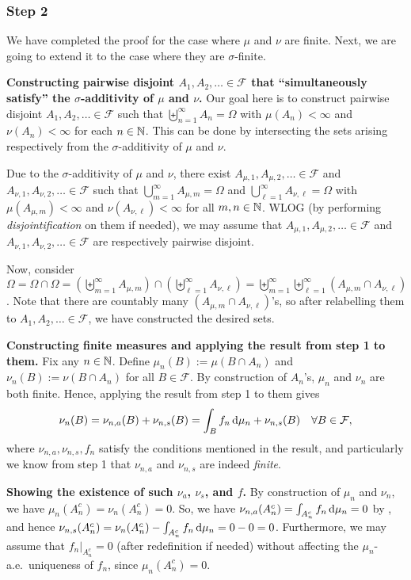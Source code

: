 \begin{enumerate}
\begin{pf}
\subsubsection*{Step 2}
We have completed the proof for the case where \(\mu\) and \(\nu\) are finite.
Next, we are going to extend it to the case where they are \(\sigma\)-finite.

\textbf{Constructing pairwise disjoint \(A_1,A_2,\dotsc\in\mathcal{F}\) that ``simultaneously
satisfy'' the \(\sigma\)-additivity of \(\mu\) and \(\nu\).}
Our goal here is to construct pairwise disjoint
\(A_1,A_2,\dotsc\in\mathcal{F}\) such that
\(\biguplus_{n=1}^{\infty}A_n=\Omega\) with \(\mu(A_n)<\infty\) and
\(\nu(A_n)<\infty\) for each \(n\in\mathbb{N}\). This can be done by intersecting the
sets arising respectively from the \(\sigma\)-additivity of \(\mu\) and \(\nu\).

Due to the \(\sigma\)-additivity of \(\mu\) and \(\nu\), there exist
\(A_{\mu,1},A_{\mu,2},\dotsc\in\mathcal{F}\) and \(A_{\nu,1},A_{\nu,2},\dotsc\in\mathcal{F}\)
such that \(\bigcup_{m=1}^{\infty}A_{\mu,m}=\Omega\) and
\(\bigcup_{\ell=1}^{\infty}A_{\nu,\ell}=\Omega\) with \(\mu(A_{\mu,m})<\infty\) and
\(\nu(A_{\nu,\ell})<\infty\) for all \(m,n\in\mathbb{N}\). WLOG (by performing
\emph{disjointification} on them if needed), we may assume that
\(A_{\mu,1},A_{\mu,2},\dotsc\in\mathcal{F}\) and \(A_{\nu,1},A_{\nu,2},\dotsc\in\mathcal{F}\)
are respectively pairwise disjoint.

Now, consider
\(\Omega=\Omega\cap\Omega=(\biguplus_{m=1}^{\infty}A_{\mu,m})\cap(\biguplus_{\ell=1}^{\infty}A_{\nu,\ell})=\biguplus_{m=1}^{\infty}\biguplus_{\ell=1}^{\infty}(A_{\mu,m}\cap
A_{\nu,\ell})\). Note that there are countably many \((A_{\mu,m}\cap
A_{\nu,\ell})\)'s, so after relabelling them to \(A_1,A_2,\dotsc\in\mathcal{F}\), we
have constructed the desired sets.

\textbf{Constructing finite measures and applying the result from step 1 to them.}
Fix any \(n\in\mathbb{N}\). Define \(\mu_n(B):=\mu(B\cap A_n)\) and
\(\nu_n(B):=\nu(B\cap A_n)\) for all \(B\in\mathcal{F}\). By construction of
\(A_n\)'s, \(\mu_n\) and \(\nu_n\) are both finite. Hence, applying the result
from step 1 to them gives
\[
\nu_n(B)=\nu_{n,a}(B)+\nu_{n,s}(B)=\int_{B}^{}f_n\odif{\mu_n}+\nu_{n,s}(B)
\quad\forall B\in\mathcal{F},
\]
where \(\nu_{n,a},\nu_{n,s},f_n\) satisfy the conditions mentioned in the result,
and particularly we know from step 1 that \(\nu_{n,a}\) and \(\nu_{n,s}\) are
indeed \emph{finite}.

\textbf{Showing the existence of such \(\nu_a\), \(\nu_s\), and \(f\).} By
construction of \(\mu_n\) and \(\nu_n\), we have
\(\mu_n(A_n^c)=\nu_n(A_n^c)=0\). So, we have
\(\nu_{n,a}(A_n^c)=\int_{A_n^c}^{}f_n\odif{\mu_n}=0\) by , and hence
\(\nu_{n,s}(A_n^c)=\nu_n(A_n^c)-\int_{A_n^c}^{}f_n\odif{\mu_n}=0-0=0\).
Furthermore, we may assume that \(f_n|_{A_n^c}=0\) (after redefinition if
needed) without affecting the \(\mu_n\)-a.e.\ uniqueness of \(f_n\), since
\(\mu_n(A_n^c)=0\).


\end{pf}
\end{enumerate}
